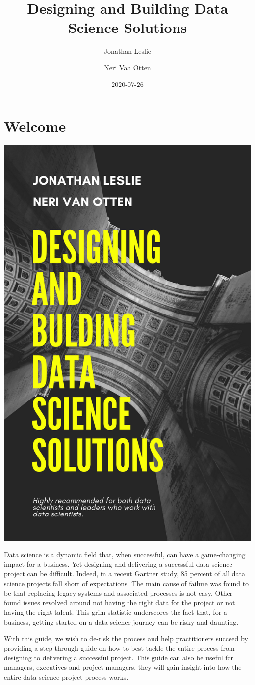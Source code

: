 \documentclass[
]{book}
\title{Designing and Building Data Science Solutions}
\author{Jonathan Leslie \and Neri Van Otten}
\date{2020-07-26}
\begin{document}
\frontmatter
\maketitle

\mainmatter
\hypertarget{welcome}{%
\chapter*{Welcome}\label{welcome}}

\includegraphics[width=0.5\linewidth]{figures/Designing and bulding data science solutions}

Data science is a dynamic field that, when successful, can have a
game-changing impact for a business. Yet designing and delivering a
successful data science project can be difficult. Indeed, in a recent
\href{https://www.gartner.com/en/newsroom/press-releases/2018-02-13-gartner-says-nearly-half-of-cios-are-planning-to-deploy-artificial-intelligence}{Gartner
study}, 85 percent of all data science projects fall short of
expectations. The main cause of failure was found to be that replacing
legacy systems and associated processes is not easy. Other found issues
revolved around not having the right data for the project or not having
the right talent. This grim statistic underscores the fact that, for a
business, getting started on a data science journey can be risky and
daunting.

With this guide, we wish to de-risk the process and help practitioners
succeed by providing a step-through guide on how to best tackle the
entire process from designing to delivering a successful project. This
guide can also be useful for managers, executives and project managers,
they will gain insight into how the entire data science project process
works.
\end{document}
